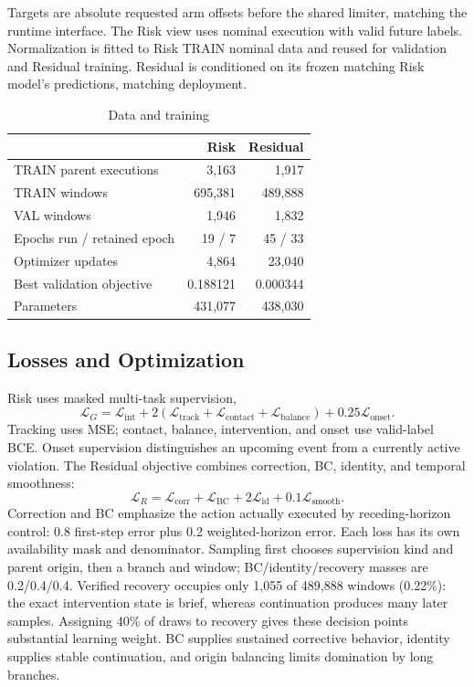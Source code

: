 \documentclass[letterpaper,10pt,conference]{ieeeconf}
\begin{document}
Targets are absolute requested arm offsets before the shared limiter, matching the runtime interface. The Risk view uses nominal execution with valid future labels. Normalization is fitted to Risk TRAIN nominal data and reused for validation and Residual training. Residual is conditioned on its frozen matching Risk model's predictions, matching deployment.

\begin{table}[t]
\centering
\caption{Data and training}
\label{tab:training}
\begin{tabular}{lrr}
\toprule
 & Risk & Residual\\
\midrule
TRAIN parent executions & 3,163 & 1,917\\
TRAIN windows & 695,381 & 489,888\\
VAL windows & 1,946 & 1,832\\
Epochs run / retained epoch & 19 / 7 & 45 / 33\\
Optimizer updates & 4,864 & 23,040\\
Best validation objective & 0.188121 & 0.000344\\
Parameters & 431,077 & 438,030\\
\bottomrule
\end{tabular}
\end{table}

\subsection{Losses and Optimization}
Risk uses masked multi-task supervision,
\begin{equation}
 \mathcal{L}_{G}=\mathcal{L}_{\mathrm{int}}
 +2(\mathcal{L}_{\mathrm{track}}+\mathcal{L}_{\mathrm{contact}}
 +\mathcal{L}_{\mathrm{balance}})+0.25\mathcal{L}_{\mathrm{onset}}.
\end{equation}
Tracking uses MSE; contact, balance, intervention, and onset use valid-label BCE. Onset supervision distinguishes an upcoming event from a currently active violation. The Residual objective combines correction, BC, identity, and temporal smoothness:
\begin{equation}
 \mathcal{L}_{R}=\mathcal{L}_{\mathrm{corr}}+\mathcal{L}_{\mathrm{BC}}
 +2\mathcal{L}_{\mathrm{id}}+0.1\mathcal{L}_{\mathrm{smooth}}.
\end{equation}
Correction and BC emphasize the action actually executed by receding-horizon control: 0.8 first-step error plus 0.2 weighted-horizon error. Each loss has its own availability mask and denominator. Sampling first chooses supervision kind and parent origin, then a branch and window; BC/identity/recovery masses are 0.2/0.4/0.4. Verified recovery occupies only 1,055 of 489,888 windows (0.22\%): the exact intervention state is brief, whereas continuation produces many later samples. Assigning 40\% of draws to recovery gives these decision points substantial learning weight. BC supplies sustained corrective behavior, identity supplies stable continuation, and origin balancing limits domination by long branches.
\end{document}
